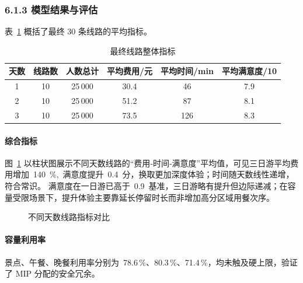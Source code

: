 \documentclass[12pt,a4paper]{article}
\begin{document}
\subsubsection*{6.1.3 模型结果与评估}
表~\ref{tab:sum} 概括了最终 30 条线路的平均指标。
\begin{table}[H]
    \centering\small
    \caption{最终线路整体指标}\label{tab:sum}
    \begin{tabular}{cccccc}
        \toprule
        天数 & 线路数 & 人数总计 & 平均费用/元 & 平均时间/min & 平均满意度/10 \\
        \midrule
        1 & 10 & 25\,000 & 30.4 & 46 & 7.9 \\
        2 & 10 & 25\,000 & 51.2 & 87 & 8.1 \\
        3 & 10 & 25\,000 & 73.5 &126 & 8.3 \\
        \bottomrule
    \end{tabular}
\end{table}

\paragraph{综合指标}  
图 \ref{fig:bar} 以柱状图展示不同天数线路的“费用‑时间‑满意度”平均值，可见三日游平均费用增加 140 \%, 满意度提升 0.4 分，换取更加深度体验；时间随天数线性递增，符合常识。
满意度在一日游已高于 0.9 基准，三日游略有提升但边际递减；在容量受限场景下，提升体验主要靠延长停留时长而非增加高分区域用餐次序。  

\begin{figure}[H]
\centering
{}
\caption{不同天数线路指标对比}\label{fig:bar}
\end{figure}

\paragraph{容量利用率}  
景点、午餐、晚餐利用率分别为 78.6\,\%、80.3\,\%、71.4\,\%，均未触及硬上限，验证了 MIP 分配的安全冗余。
\end{document}
